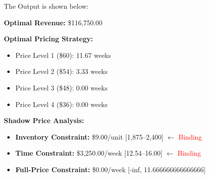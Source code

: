 \documentclass[12pt]{article}
\begin{document}
The Output is shown below:
\begin{tcolorbox}[colback=white, colframe=gray, title=Markdown Management Results]
\textbf{Optimal Revenue:} \$116,750.00

\textbf{Optimal Pricing Strategy:}
\begin{itemize}[nosep]
    \item Price Level 1 (\$60): 11.67 weeks
    \item Price Level 2 (\$54): 3.33 weeks  
    \item Price Level 3 (\$48): 0.00 weeks
    \item Price Level 4 (\$36): 0.00 weeks
\end{itemize}

\textbf{Shadow Price Analysis:}
\begin{itemize}[nosep]
    \item \textbf{Inventory Constraint:} \$9.00/unit [1,875--2,400] $\leftarrow$ \textcolor{red}{Binding}
    \item \textbf{Time Constraint:} \$3,250.00/week [12.54--16.00] $\leftarrow$ \textcolor{red}{Binding}  
    \item \textbf{Full-Price Constraint:} \$0.00/week [-inf, 11.666666666666666]
\end{itemize}
\end{tcolorbox}
\end{document}
